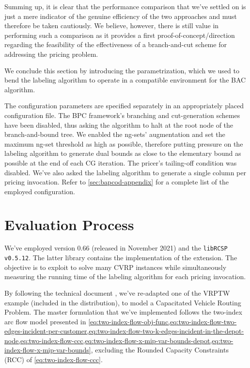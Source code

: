 Summing up, it is clear that the performance comparison that we've settled on is just
a mere indicator of the genuine efficiency of the two approaches and must
therefore be taken cautiously.
We believe, however, there is still value in performing such a comparison as it provides
a first proof-of-concept/direction regarding the feasibility of the effectiveness
of a branch-and-cut scheme for addressing the pricing problem.

\medskip

We conclude this section by introducing the \bapcod{} parametrization,
which we used to bend the labeling algorithm to operate in a compatible environment for the BAC algorithm.

The configuration parameters are specified separately
in an appropriately placed configuration file.
The BPC framework's branching and cut-generation schemes have been disabled,
thus asking the algorithm to halt at the root node of the branch-and-bound tree.
We enabled the ng-sets' augmentation and set the maximum ng-set threshold as high as possible,
therefore putting pressure on the labeling algorithm to generate dual bounds as close
to the elementary bound as possible at the end of each CG iteration.
The pricer's tailing-off condition was disabled.
We've also asked the labeling algorithm to generate
a single column per pricing invocation.
Refer to \cref{sec:bapcod-appendix} for a complete list of the employed configuration.

\section{Evaluation Process}
\label{sec:results-evaluation-process}

We've employed \bapcod{} version 0.66 (released in November 2021) and the \texttt{libRCSP v0.5.12}.
The latter library contains the implementation of the \vrpsolver{} extension.
The objective is to exploit \bapcod{} to solve many CVRP instances while simultaneously
measuring the running time of the labeling algorithm for each pricing invocation.

\medskip

By following the \bapcod{} technical document \parencite{sadykov2021},
we've re-adapted one of the VRPTW example (included in the distribution),
to model a Capacitated Vehicle Routing Problem.
The master formulation that we've implemented follows the two-index arc flow model
presented in \cref{eq:two-index-flow-obj-func,eq:two-index-flow-two-edges-incident-per-customer,eq:two-index-flow-two-k-edges-incident-in-the-depot-node,eq:two-index-flow-ccc,eq:two-index-flow-x-mip-var-bounds-depot,eq:two-index-flow-x-mip-var-bounds},
excluding the Rounded Capacity Constraints (RCC) of \cref{eq:two-index-flow-ccc}.

